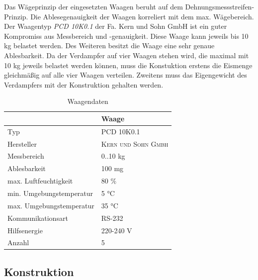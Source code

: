 Das Wägeprinzip der eingesetzten Waagen beruht auf dem Dehnungsmessstreifen-Prinzip. Die Ablesegenauigkeit der Waagen korreliert mit dem max. Wägebereich. Der Waagentyp \textit{PCD 10K0.1} der Fa. Kern und Sohn GmbH ist ein guter Kompromiss aus Messbereich und -genauigkeit. Diese Waage kann  jeweils  bis 10 kg belastet  werden. Des Weiteren besitzt die Waage eine sehr genaue Ablesbarkeit. Da der Verdampfer auf vier Waagen stehen wird, die maximal mit 10 kg jeweils belastet werden können, muss die Konstuktion erstens die Eismenge gleichmäßig auf alle vier Waagen verteilen. Zweitens muss das Eigengewicht des Verdampfers mit der Konstruktion gehalten werden. 


 
\begin{table}[htb]
\centering
\caption{Waagendaten}\vspace{6pt}
\begin{tabular}{ll}
\hline 
 & \textbf{Waage}  \\ 
\hline 
\hline 
Typ & PCD 10K0.1 \\ 
\hline 
Hersteller & \textsc{Kern und Sohn Gmbh} \\ 
\hline 
Messbereich & 0..10 kg \\ 
\hline 
Ablesbarkeit & 100 mg\\ 
\hline 
max. Luftfeuchtigkeit & 80 $\%$\\
\hline
min. Umgebungstemperatur & 5 °C\\
\hline
max. Umgebungstemperatur & 35 °C\\
\hline
Kommunikationsart & RS-232 \\ 
\hline 
Hilfsenergie & 220-240  V   \\ 
\hline
Anzahl & 5 \\ 
\hline 
\hline 
\end{tabular} 
\label{tab:Waagendaten}
\end{table}



\subsection{Konstruktion}
\label{subsec:Waagen-Konstruktion}


